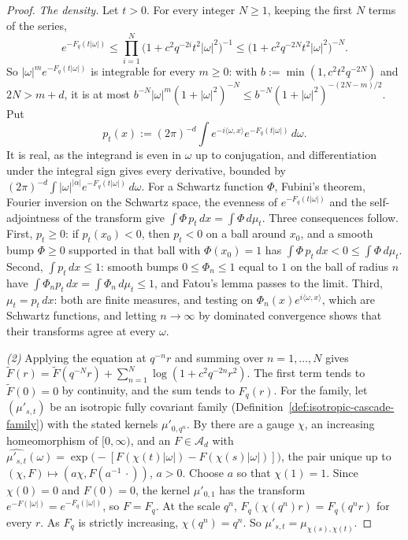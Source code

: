 \begin{proof}
\emph{The density.} Let $t > 0$. For every integer $N \ge 1$, keeping the first $N$
terms of the series,
\[
  e^{-F_q(t|\omega|)} \le \prod_{i=1}^N\bigl(1 + c^2q^{-2i}t^2|\omega|^2\bigr)^{-1}
   \le \bigl(1 + c^2q^{-2N}t^2|\omega|^2\bigr)^{-N} .
\]
So $|\omega|^m e^{-F_q(t|\omega|)}$ is integrable for every $m \ge 0$: with $b := \min(1,
c^2t^2q^{-2N})$ and $2N > m + d$, it is at most
$b^{-N}|\omega|^m(1 + |\omega|^2)^{-N} \le b^{-N}(1 + |\omega|^2)^{-(2N - m)/2}$. Put
\[
  p_t(x) := (2\pi)^{-d}\int e^{-i\langle\omega, x\rangle}e^{-F_q(t|\omega|)}\,d\omega .
\]
It is real, as the integrand is even in $\omega$ up to conjugation, and differentiation under the
integral sign gives every derivative, bounded by
$(2\pi)^{-d}\int|\omega|^{|\alpha|}e^{-F_q(t|\omega|)}\,d\omega$. For a Schwartz function $\Phi$,
Fubini's theorem, Fourier inversion on the Schwartz space, the evenness of
$e^{-F_q(t|\omega|)}$ and the self-adjointness of the transform give
$\int\Phi\,p_t\,dx = \int\Phi\,d\mu_t$. Three consequences follow. First, $p_t \ge 0$: if
$p_t(x_0) < 0$, then $p_t < 0$ on a ball around $x_0$, and a smooth bump $\Phi \ge 0$ supported in
that ball with $\Phi(x_0) = 1$ has $\int\Phi\,p_t\,dx < 0 \le \int\Phi\,d\mu_t$. Second,
$\int p_t\,dx \le 1$: smooth bumps $0 \le \Phi_n \le 1$ equal to $1$ on the ball of radius $n$
have $\int\Phi_np_t\,dx = \int\Phi_n\,d\mu_t \le 1$, and Fatou's lemma passes to the limit. Third,
$\mu_t = p_t\,dx$: both are finite measures, and testing on $\Phi_n(x)e^{i\langle\omega, x\rangle}$,
which are Schwartz functions, and letting $n \to \infty$ by dominated convergence shows that their
transforms agree at every $\omega$.

\emph{(2)} Applying the equation at $q^{-n}r$ and summing over $n = 1, \dots, N$ gives
$\widetilde F(r) = \widetilde F(q^{-N}r) + \sum_{n=1}^N\log(1 + c^2q^{-2n}r^2)$. The first term tends
to $\widetilde F(0) = 0$ by continuity, and the sum tends to $F_q(r)$. For the family, let
$(\mu'_{s,t})$ be an isotropic fully covariant family (Definition~\ref{def:isotropic-cascade-family}) with the
stated kernels $\mu'_{0,q^n}$. By  there are a gauge $\chi$, an
increasing homeomorphism of $[0, \infty)$, and an $F \in \mathcal{A}_d$ with
$\widehat{\mu'_{s,t}}(\omega) = \exp\bigl(-[F(\chi(t)|\omega|) - F(\chi(s)|\omega|)]\bigr)$, the pair
unique up to $(\chi, F) \mapsto (a\chi, F(a^{-1}\,\cdot))$, $a > 0$. Choose $a$ so that
$\chi(1) = 1$. Since $\chi(0) = 0$ and $F(0) = 0$, the kernel $\mu'_{0,1}$ has the transform
$e^{-F(|\omega|)} = e^{-F_q(|\omega|)}$, so $F = F_q$. At the scale $q^n$,
$F_q(\chi(q^n)r) = F_q(q^nr)$ for every $r$. As $F_q$ is strictly increasing, $\chi(q^n) = q^n$. So
$\mu'_{s,t} = \mu_{\chi(s),\chi(t)}$.


\end{proof}
